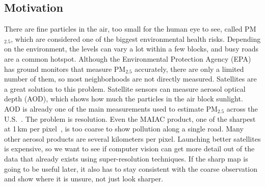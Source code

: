 \documentclass[conference]{IEEEtran}
\begin{document}
\subsection{Motivation}
There are fine particles in the air, too small for the human eye to see, called PM$_{2.5}$, which are considered one of the biggest environmental health risks. Depending on the environment, the levels can vary a lot within a few blocks, and busy roads are a common hotspot. Although the Environmental Protection Agency (EPA) has ground monitors that measure PM$_{2.5}$ accurately, there are only a limited number of them, so most neighborhoods are not directly measured. Satellites are a great solution to this problem. Satellite sensors can measure aerosol optical depth (AOD), which shows how much the particles in the air block sunlight. AOD is already one of the main measurements used to estimate PM$_{2.5}$ across the U.S.~\cite{di2019ensemble}. The problem is resolution. Even the MAIAC product, one of the sharpest at 1\,km per pixel~\cite{lyapustin2018maiac}, is too coarse to show pollution along a single road. Many other aerosol products are several kilometers per pixel. Launching better satellites is expensive, so we want to see if computer vision can get more detail out of the data that already exists using super-resolution techniques. If the sharp map is going to be useful later, it also has to stay consistent with the coarse observation and show where it is unsure, not just look sharper.
\end{document}
